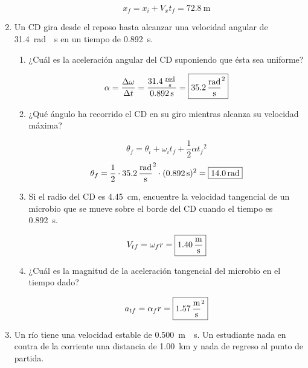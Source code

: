 \documentclass[Física - Práctica.root.tex]{subfiles}
\begin{document}
\begin{enumerate}
\begin{enumerate}
                \[x_f=x_i+V_xt_f=\boxed{\SI{72,8}{\meter}}\]
        \end{enumerate}

  \item Un CD gira desde el reposo hasta alcanzar una velocidad angular de \SI{31,4}{\radian\over\second} en un tiempo de \SI{0,892}{\second}.

        \begin{enumerate}
          \item ¿Cuál es la aceleración angular del CD suponiendo que ésta sea uniforme?

                \[\alpha=\frac{\Delta\omega}{\Delta t}=\frac{\SI{31,4}{\radian\over\second}}{\SI{0,892}{\second}}=\boxed{\SI{35,2}{\radian\over\second\squared}}\]

          \item ¿Qué ángulo ha recorrido el CD en su giro mientras alcanza su velocidad máxima?

                \[\theta_f=\theta_i+\omega_it_f+\frac{1}{2}\alpha{t_f}^2\]
                \[\theta_f=\frac{1}{2}\cdot\SI{35,2}{\radian\over\second\squared}\cdot(\SI{0,892}{\second})^2=\boxed{\SI{14,0}{\radian}}\]

          \item Si el radio del CD es \SI{4,45}{\cm}, encuentre la velocidad tangencial de un microbio que se mueve sobre el borde del CD cuando el tiempo es \SI{0,892}{\second}.

                \[V_{tf}=\omega_f r=\boxed{\SI{1,40}{\meter\over\second}}\]

          \item ¿Cuál es la magnitud de la aceleración tangencial del microbio en el tiempo dado?

                \[a_{tf}=\alpha_f r=\boxed{\SI{1,57}{\meter\over\second\squared}}\]
        \end{enumerate}

  \item Un río tiene una velocidad estable de \SI{0,500}{\meter\over\second}. Un estudiante nada en contra de la corriente una distancia de \SI{1,00}{\km} y nada de regreso al punto de partida.

        \begin{center}
        \end{center}


\end{enumerate}
\end{document}
